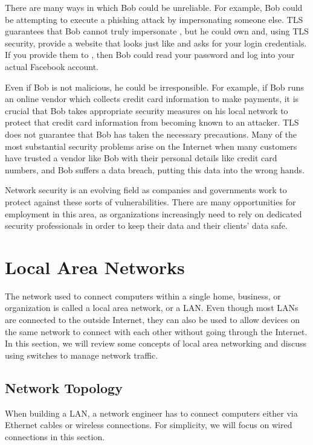 There are many ways in which Bob could be unreliable. For example, Bob could be attempting to execute a phishing attack by impersonating someone else. TLS guarantees that Bob cannot truly impersonate , but he could own  and, using TLS security, provide a website that looks just like  and asks for your login credentials. If you provide them to , then Bob could read your password and log into your actual Facebook account.

Even if Bob is not malicious, he could be irresponsible. For example, if Bob runs an online vendor which collects credit card information to make payments, it is crucial that Bob takes appropriate security measures on his local network to protect that credit card information from becoming known to an attacker. TLS does not guarantee that Bob has taken the necessary precautions. Many of the most substantial security problems arise on the Internet when many customers have trusted a vendor like Bob with their personal details like credit card numbers, and Bob suffers a data breach, putting this data into the wrong hands.

Network security is an evolving field as companies and governments work to protect against these sorts of vulnerabilities. There are many opportunities for employment in this area, as organizations increasingly need to rely on dedicated security professionals in order to keep their data and their clients' data safe.

\section{Local Area Networks}

The network used to connect computers within a single home, business, or organization is called a local area network, or a LAN. Even though most LANs are connected to the outside Internet, they can also be used to allow devices on the same network to connect with each other without going through the Internet. In this section, we will review some concepts of local area networking and discuss using switches to manage network traffic.

\subsection{Network Topology}

When building a LAN, a network engineer has to connect computers either via Ethernet cables or wireless connections. For simplicity, we will focus on wired connections in this section.

